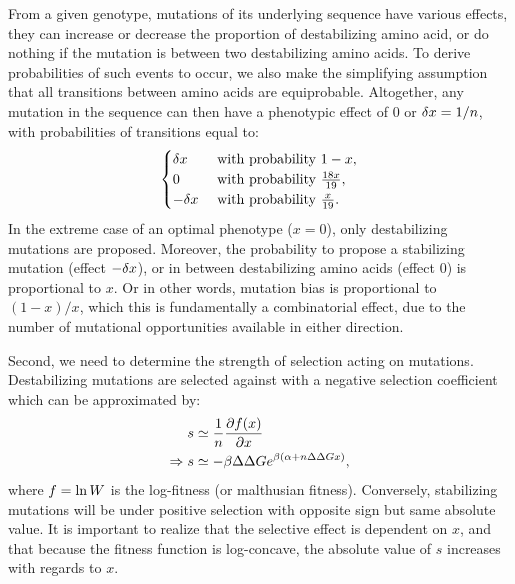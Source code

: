 From a given genotype, mutations of its underlying sequence have various effects, they can increase or decrease the proportion of destabilizing amino acid, or do nothing if the mutation is between two destabilizing amino acids.
To derive probabilities of such events to occur, we also make the simplifying assumption that all transitions between amino acids are equiprobable.
Altogether, any mutation in the sequence can then have a phenotypic effect of $0$ or $\delta x=1 /n$, with probabilities of transitions equal to:
\begin{gather}
    \begin{cases}
        \dx &\text{ with probability } 1-x, \\
        0 &\text{ with probability } \frac{18 x }{19}, \\
        -\dx &\text{ with probability } \frac{x}{19}.\\
    \end{cases} \label{eq:proba}
\end{gather}
In the extreme case of an optimal phenotype ($x = 0$), only destabilizing mutations are proposed.
Moreover, the probability to propose a stabilizing mutation (effect $-\delta x$), or in between destabilizing amino acids (effect $0$) is proportional to $x$.
Or in other words, mutation bias is proportional to $(1-x)/x$, which this is fundamentally a combinatorial effect, due to the number of mutational opportunities available in either direction.

Second, we need to determine the strength of selection acting on mutations.
Destabilizing mutations are selected against with a negative selection coefficient which can be approximated by:
\begin{align}
    s & \simeq \frac{1}{\NbrSites}\frac{ \partial \logfit (x) }{\partial x} \label{eq:s} \\
    \Rightarrow s & \simeq - \beta \DeltaDeltaG e^{\beta (\DeltaGmin + \NbrSites \DeltaDeltaG x)}, \label{eq:s-unfolded}
\end{align}
where $ f = \ln W$ is the log-fitness (or malthusian fitness).
Conversely, stabilizing mutations will be under positive selection with opposite sign but same absolute value.
It is important to realize that the selective effect is dependent on $x$, and that because the fitness function is log-concave, the absolute value of $s$ increases with regards to $x$.


